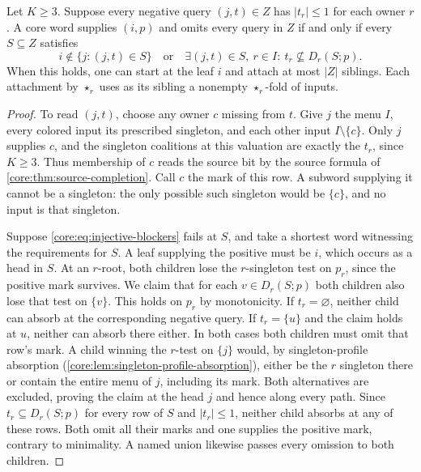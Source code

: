 \begin{theorem}
\label{core:thm:injective-blockers}
Let $K\ge3$. Suppose every negative query $(j,t)\in Z$ has
$|t_r|\le1$ for each owner $r$. A core word supplies $(i,p)$ and
omits every query in $Z$ if and only if every $S\subseteq Z$ satisfies
\begin{equation}\label{core:eq:injective-blockers}
 i\notin\{j:(j,t)\in S\}
 \quad\text{or}\quad
 \exists (j,t)\in S,\ r\in I:\ t_r\not\subseteq D_r(S;p).
\end{equation}
When this holds, one can start at the leaf $i$ and attach at most $|Z|$
siblings. Each attachment by $\star_r$ uses as its sibling a nonempty
$\star_r$-fold of inputs.
\end{theorem}
\begin{proof}
To read $(j,t)$, choose any owner $c$ missing from $t$. Give $j$ the
menu $I$, every colored input its prescribed singleton, and each other
input $I\setminus\{c\}$. Only $j$ supplies $c$, and the singleton
coalitions at this valuation are exactly the $t_r$, since $K\ge3$.
Thus membership of $c$ reads the source bit by the source formula
of \cref{core:thm:source-completion}. Call $c$ the mark of this row.
A subword supplying it cannot be a singleton: the only possible such
singleton would be $\{c\}$, and no input is that singleton.

Suppose \eqref{core:eq:injective-blockers} fails at $S$, and take a
shortest word witnessing the requirements for $S$. A leaf supplying the
positive must be $i$, which occurs as a head in $S$. At an $r$-root,
both children lose the $r$-singleton test on $p_r$, since the positive
mark survives. We claim that for each $v\in D_r(S;p)$ both children
also lose that test on $\{v\}$. This holds on $p_r$ by monotonicity.
If $t_r=\varnothing$, neither child can absorb at the corresponding
negative query. If $t_r=\{u\}$ and the claim holds at $u$, neither
can absorb there either. In both cases both children must omit that
row's mark. A child winning the $r$-test on $\{j\}$ would, by
singleton-profile absorption
(\cref{core:lem:singleton-profile-absorption}), either be the
$r$ singleton there or contain the entire menu of $j$, including its mark. Both alternatives
are excluded, proving the claim at the head $j$ and hence along
every path. Since $t_r\subseteq D_r(S;p)$ for every row of $S$ and
$|t_r|\le1$, neither child absorbs at any of these rows. Both omit
all their marks and one supplies the positive mark, contrary to
minimality. A named union likewise passes every omission to both children.


\end{proof}
